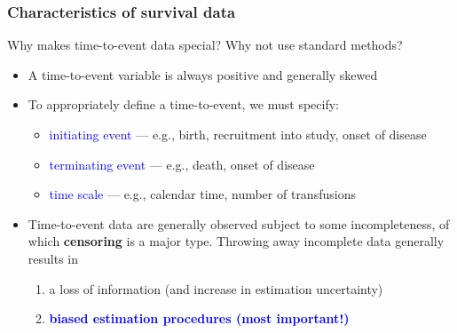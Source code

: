 \documentclass[10pt,t]{beamer}
\begin{document}
\begin{frame}
\frametitle{Characteristics of survival data}

\vspace{-7 mm}

Why makes time-to-event data special? Why not use standard methods? 
\medskip

\begin{itemize}
\item A time-to-event variable is always positive and generally skewed  
\medskip

\item To appropriately define a time-to-event, we must specify:  
\medskip

\begin{itemize}
\item \textcolor{blue}{initiating event} --- e.g., birth, recruitment into study, onset of disease   

\medskip

\item \textcolor{blue}{terminating event} --- e.g., death, onset of disease 
\medskip
 
\item \textcolor{blue}{time scale} --- e.g., calendar time, number of transfusions  
\end{itemize}
\medskip

\item Time-to-event data are generally observed subject to some incompleteness, of which \textbf{censoring} is a major type. Throwing away incomplete data generally results in
\medskip

\begin{enumerate}
\item a loss of information (and increase in estimation uncertainty)

\medskip
\item \textbf{\textcolor{blue}{biased estimation procedures (most important!)}}
\end{enumerate}

\end{itemize}

\end{frame}
\end{document}

